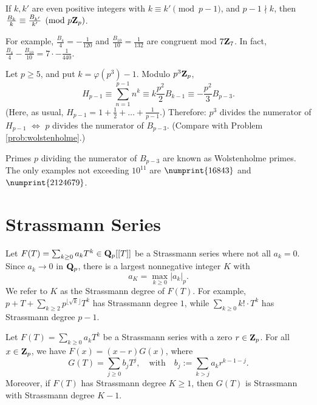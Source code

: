 \begin{prob}[Kummer]\label{prob:kummer} If $k,k'$ are even positive integers with $k\equiv k'\pmod{p-1}$, and $p-1\nmid k$, then $\frac{B_k}{k}\equiv \frac{B_{k'}}{k'}\pmod{p\mathbf{Z}_{p}}$.
\end{prob}

{\scriptsize For example, $\frac{B_{4}}{4}= -\frac{1}{120}$ and $\frac{B_{10}}{10}= \frac{1}{132}$ are congruent mod $7\mathbf{Z}_{7}$. In fact, $\frac{B_{4}}{4} - \frac{B_{10}}{10} = 7 \cdot -\frac{1}{440}$.}

\begin{prob}[Glaisher]\label{prob:glaisherharmonic}  Let $p \ge 5$, and put $k = \varphi(p^3)-1$. Modulo $p^3 \mathbf{Z}_{p}$, 
\[ H_{p-1} \equiv \sum_{n=1}^{p-1} n^{k} \equiv  k\frac{p^2}{2} B_{k-1} \equiv -\frac{p^2}{3} B_{p-3}.\]
(Here, as usual, $H_{p-1} = 1 + \frac12 + \dots + \frac1{p-1}$.) Therefore: $p^3$ divides the numerator of $H_{p-1}$ $\Longleftrightarrow$ $p$ divides the numerator of $B_{p-3}$. (Compare with Problem \ref{prob:wolstenholme}.) 

{\scriptsize Primes $p$ dividing the numerator of $B_{p-3}$ are known as \textsf{Wolstenholme primes}. The only examples not exceeding $10^{11}$ are 	$\numprint{16843}$ and $\numprint{2124679}$.}
\end{prob}


\section*{Strassmann Series}
Let $F(T) = \sum_{k\ge 0} a_k T^k \in \mathbf{Q}_p[[T]]$ be a Strassmann series where not all $a_k=0$. Since $a_k\to 0$ in $\mathbf{Q}_p$, there is a largest nonnegative integer $K$ with
\[ a_K = \max_{k\ge 0} |a_k|_{p}. \]
We refer to $K$ as the \textsf{Strassmann degree} of $F(T)$. For example, $p+T+\sum_{k\ge 2} p^{\lfloor \sqrt{k}\rfloor} T^k$ has Strassmann degree $1$, while $\sum_{k\ge 0} k!\cdot T^k$ has Strassmann degree $p-1$.

 \begin{prob}\label{prob:strassdivide} Let $F(T) = \sum_{k \ge 0} a_k T^k$ be a Strassmann series with a zero $r \in \mathbf{Z}_p$. For all $x \in \mathbf{Z}_p$, we have $F(x) = (x-r) G(x)$, where 
\[ G(T) = \sum_{j\ge 0} b_j T^j, \quad\text{with}\quad b_j:= \sum_{k > j}a_k r^{k-1-j}. \]
Moreover, if $F(T)$ has Strassmann degree $K\ge 1$, then $G(T)$ is Strassmann with Strassmann degree $K-1$.
\end{prob}

